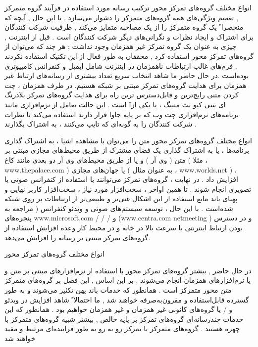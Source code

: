 \documentclass{beamer}
\begin{document}
\begin{persian}
\begin{frame}{انواع مختلف گروه‌های تمرکز محور}
	ترکیب رسانه مورد استفاده در فرآیند گروه متمرکز , تعمیم ویژگی‌های همه گروه‌های متمرکز را دشوار می‌سازد . با این حال , آنچه که منحصرا ً یک گروه متمرکز را از یک مصاحبه متمایز می‌کند , ظرفیت شرکت کنندگان برای اشتراک و ایجاد نظرات و نگرانی‌های دیگر شرکت کنندگان است . قبل از اینترنت , چیزی به عنوان یک گروه تمرکز غیر همزمان وجود نداشت ; هر چند که می‌توان از گروه‌های تمرکز محور استفاده کرد , محققان به طور فعال از این تکنیک استفاده نکردند . فرم‌های غالب ارتباطات ناهمزمان در اینترنت شامل ایمیل و کنفرانس کامپیوتری بوده‌است .در حال حاضر ما شاهد انتخاب سریع تعداد بیشتری از رسانه‌های ارتباط غیر همزمان برای هدایت گروه‌های تمرکز مبتنی بر شبکه هستیم. در طرف همزمان ، چت کردن متنی رایج‌ترین و قابل‌دسترس ترین راه برای هدایت گروه‌های تمرکز بلادرنگ است . این حالت تعامل از نرم‌افزاری مانند Iای سی کیو نت متینگ ، یا یکی از برنامه‌های نرم‌افزاری چت وب که بر پایه جاوا قرار دارند استفاده می‌کند تا نظرات شرکت کنندگان را به گونه‌ای که تایپ می‌کنند ، به اشتراک بگذارند .
\end{frame}	
\begin{frame}{انواع مختلف گروه‌های تمرکز محور}
	متن را می‌توان با مشاهده اشیا ، به اشتراک گذاری برنامه‌ها ، یا به اشتراک گذاری یک فضای مشترک از طریق محیط‌های مجازی مبتنی بر متن ( وی آر ) و یا از طریق محیط‌های وی آر دو بعدی مانند کاخ ( مثلا ، www.thepalace.com ) یا جهان‌های مجازی ( به عنوان مثال ، www.worlds.net ) ، افزایش داد . در نهایت ، گروه‌های تمرکز می‌توانند با استفاده از کنفرانس صوتی یا تصویری انجام شوند . تا همین اواخر ، سخت‌افزار مورد نیاز ، سخت‌افزار کاربر نهایی و پهنای باند مانع استفاده از این اشکال غنی‌تر و طبیعی‌تر از ارتباطات بر روی شبکه شده‌است . با این حال ، توسعه سیستم‌های صوتی و ویدئو کنفرانس ( مراجعه به پنجره‌های www.microsoft.com / / / و (www.centra.com netmeeting ) و در دسترس بودن ارتباط اینترنتی با سرعت بالا در خانه و در محیط کار وعده افزایش استفاده از گروه‌های تمرکز مبتنی بر رسانه را افزایش می‌دهد. 


\end{frame}


\begin{frame}{انواع مختلف گروه‌های تمرکز محور}

در حال حاضر , بیشتر گروه‌های تمرکز محور با استفاده از نرم‌افزارهای مبتنی بر متن و یا نرم‌افزارهای همزمان انجام می‌شوند . بر این اساس , این فصل بر گروه‌های متمرکز متن محور متمرکز است . همانطور که خدمات باند پهن تکثیر می‌شوند و به طور گسترده قابل‌استفاده و مقرون‌به‌صرفه خواهند شد , ما احتمالا ً شاهد افزایش در ویدئو و / یا گروه‌های کانونی غیر همزمان و غیر همزمان خواهیم بود . همانطور که این خدمات چندرسانه‌ای گروه‌های تمرکز بر پایه خالص , بیشتر شبیه گروه‌های متمرکز با چهره هستند . گروه‌های متمرکز با تمرکز رو به رو به طور فزاینده‌ای مرتبط و مفید خواهند شد



\end{frame}
\end{persian}
\end{document}
